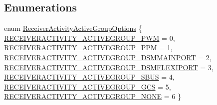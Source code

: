 \subsection*{\-Enumerations}
\begin{DoxyCompactItemize}
\item 
enum \hyperlink{group___receiver_activity_ga96212595e0c8f69768c0ca3adf9e5a28}{\-Receiver\-Activity\-Active\-Group\-Options} \{ \*
\hyperlink{group___receiver_activity_gga96212595e0c8f69768c0ca3adf9e5a28a86f7b20c6835f4482c13d5e87bc2fbb0}{\-R\-E\-C\-E\-I\-V\-E\-R\-A\-C\-T\-I\-V\-I\-T\-Y\-\_\-\-A\-C\-T\-I\-V\-E\-G\-R\-O\-U\-P\-\_\-\-P\-W\-M} = 0, 
\hyperlink{group___receiver_activity_gga96212595e0c8f69768c0ca3adf9e5a28a9f85f52d6ba55ff342489d11c0137e84}{\-R\-E\-C\-E\-I\-V\-E\-R\-A\-C\-T\-I\-V\-I\-T\-Y\-\_\-\-A\-C\-T\-I\-V\-E\-G\-R\-O\-U\-P\-\_\-\-P\-P\-M} = 1, 
\hyperlink{group___receiver_activity_gga96212595e0c8f69768c0ca3adf9e5a28adb9504824972292d221312f3e17bce49}{\-R\-E\-C\-E\-I\-V\-E\-R\-A\-C\-T\-I\-V\-I\-T\-Y\-\_\-\-A\-C\-T\-I\-V\-E\-G\-R\-O\-U\-P\-\_\-\-D\-S\-M\-M\-A\-I\-N\-P\-O\-R\-T} = 2, 
\hyperlink{group___receiver_activity_gga96212595e0c8f69768c0ca3adf9e5a28ac4af852104c38b4469844cd4c5fedfbd}{\-R\-E\-C\-E\-I\-V\-E\-R\-A\-C\-T\-I\-V\-I\-T\-Y\-\_\-\-A\-C\-T\-I\-V\-E\-G\-R\-O\-U\-P\-\_\-\-D\-S\-M\-F\-L\-E\-X\-I\-P\-O\-R\-T} = 3, 
\*
\hyperlink{group___receiver_activity_gga96212595e0c8f69768c0ca3adf9e5a28a04e5d5fb882fe2a0d7c3c397ab54363d}{\-R\-E\-C\-E\-I\-V\-E\-R\-A\-C\-T\-I\-V\-I\-T\-Y\-\_\-\-A\-C\-T\-I\-V\-E\-G\-R\-O\-U\-P\-\_\-\-S\-B\-U\-S} = 4, 
\hyperlink{group___receiver_activity_gga96212595e0c8f69768c0ca3adf9e5a28a1f3d88ba990cbb12e6f70dba8caa3800}{\-R\-E\-C\-E\-I\-V\-E\-R\-A\-C\-T\-I\-V\-I\-T\-Y\-\_\-\-A\-C\-T\-I\-V\-E\-G\-R\-O\-U\-P\-\_\-\-G\-C\-S} = 5, 
\hyperlink{group___receiver_activity_gga96212595e0c8f69768c0ca3adf9e5a28ad0240e7972bfc3c9bd8dce74fd3fa513}{\-R\-E\-C\-E\-I\-V\-E\-R\-A\-C\-T\-I\-V\-I\-T\-Y\-\_\-\-A\-C\-T\-I\-V\-E\-G\-R\-O\-U\-P\-\_\-\-N\-O\-N\-E} = 6
 \}
\end{DoxyCompactItemize}

